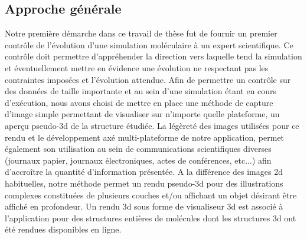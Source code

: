  
\subsection*{Approche générale}

Notre première démarche dans ce travail de thèse fut de fournir un premier contrôle de l'évolution d'une simulation moléculaire à un expert scientifique. Ce contrôle doit permettre d'appréhender la direction vers laquelle tend la simulation et éventuellement mettre en évidence une évolution ne respectant pas les contraintes imposées et l'évolution attendue. Afin de permettre un contrôle sur des données de taille importante et au sein d'une simulation étant en cours d’exécution, nous avons choisi de mettre en place une méthode de capture d'image simple permettant de visualiser sur n'importe quelle plateforme, un aperçu pseudo-3d de la structure étudiée. La légèreté des images utilisées pour ce rendu et le développement axé multi-plateforme de notre application, permet également son utilisation au sein de communications scientifiques diverses (journaux papier, journaux électroniques, actes de conférences, etc...) afin d’accroître la quantité d'information présentée. A la différence des images 2d habituelles, notre méthode permet un rendu pseudo-3d pour des illustrations complexes constituées de plusieurs couches et/ou affichant un objet désirant être affiché en profondeur. Un rendu 3d sous forme de visualiseur 3d est associé à l'application pour des structures entières de molécules dont les structures 3d ont été rendues disponibles en ligne.

